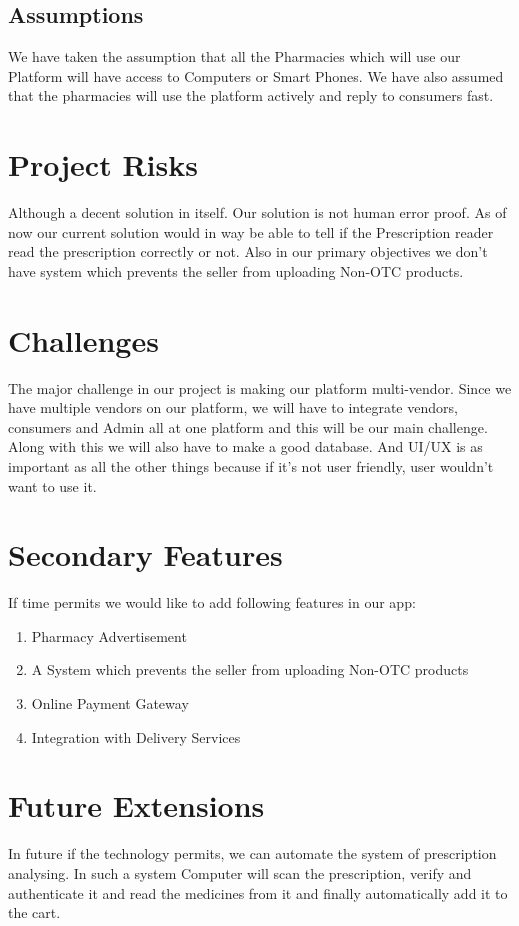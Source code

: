 \documentclass[fleqn,10pt]{../SelfArx} %
\begin{document}
\subsection{Assumptions}
We have taken the assumption that all the Pharmacies which will use our Platform will have access to Computers or Smart Phones.
We have also assumed that the pharmacies will use the platform actively and reply to consumers fast.



\section{Project Risks}
Although a decent solution in itself. Our solution is not human error proof. As of now our current solution would in way be able to tell if the Prescription reader read the prescription correctly or not. Also in our primary objectives we don't have system which prevents the seller from uploading Non-OTC products.

\section{Challenges}
The major challenge in our project is making our platform multi-vendor. Since we have multiple vendors on our platform, we will have to integrate vendors, consumers and Admin all at one platform and this will be our main challenge. Along with this we will also have to make a good database. And UI/UX is as important as all the other things because if it's not user friendly, user wouldn't want to use it.

\section{Secondary Features}
If time permits we would like to add following features in our app:
\begin{enumerate}
\item Pharmacy Advertisement
\item A System which prevents the seller from uploading Non-OTC products
\item Online Payment Gateway
\item Integration with Delivery Services
\end{enumerate}

\section{Future Extensions}
In future if the technology permits, we can automate the system of prescription analysing. In such a system Computer will scan the prescription, verify and authenticate it and read the medicines from it and finally automatically add it to the cart.
\end{document}

